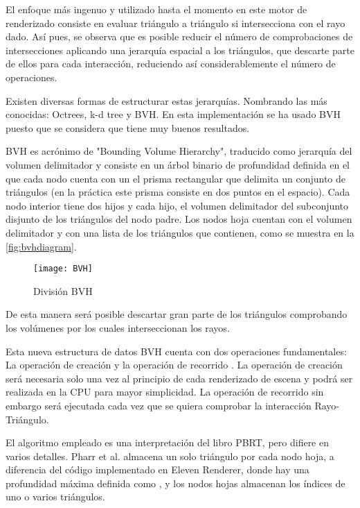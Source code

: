 El enfoque más ingenuo y utilizado hasta el momento en este motor de renderizado consiste en evaluar triángulo a triángulo si intersecciona con el rayo dado. Así pues, se observa que es posible reducir el número de comprobaciones de intersecciones aplicando una jerarquía espacial a los triángulos, que descarte parte de ellos para cada interacción, reduciendo así considerablemente el número de operaciones.

Existen diversas formas de estructurar estas jerarquías. Nombrando las más conocidas: Octrees, k-d tree y BVH. En esta implementación se ha usado BVH puesto que se considera que tiene muy buenos resultados.

BVH es acrónimo de "Bounding Volume Hierarchy", traducido como jerarquía del volumen delimitador y consiste en un árbol binario de profundidad definida en el que cada nodo cuenta con un el prisma rectangular que delimita un conjunto de triángulos (en la práctica este prisma consiste en dos puntos en el espacio). Cada nodo interior tiene dos hijos y cada hijo, el volumen delimitador del subconjunto disjunto de los triángulos del nodo padre. Los nodos hoja cuentan con el volumen delimitador y con una lista de los triángulos que contienen, como se muestra en la \autoref{fig:bvhdiagram}.

\begin{figure}[H]
    \centering
	\texttt{[image: BVH]}
	\caption{División BVH}
	\label{fig:bvhdiagram}
\end{figure}

De esta manera será posible descartar gran parte de los triángulos comprobando los volúmenes por los cuales interseccionan los rayos.

Esta nueva estructura de datos BVH cuenta con dos operaciones fundamentales: La operación de creación  y la operación de recorrido . La operación de creación será necesaria solo una vez al principio de cada renderizado de escena y podrá ser realizada en la CPU para mayor simplicidad. La operación de recorrido sin embargo será ejecutada cada vez que se quiera comprobar la interacción Rayo-Triángulo.

El algoritmo empleado es una interpretación del libro PBRT, pero difiere en varios detalles. Pharr et al. \cite{pharr2016physically} almacena un solo triángulo por cada nodo hoja, a diferencia del código implementado en Eleven Renderer, donde hay una profundidad máxima definida como , y los nodos hojas almacenan los índices de uno o varios triángulos. 

